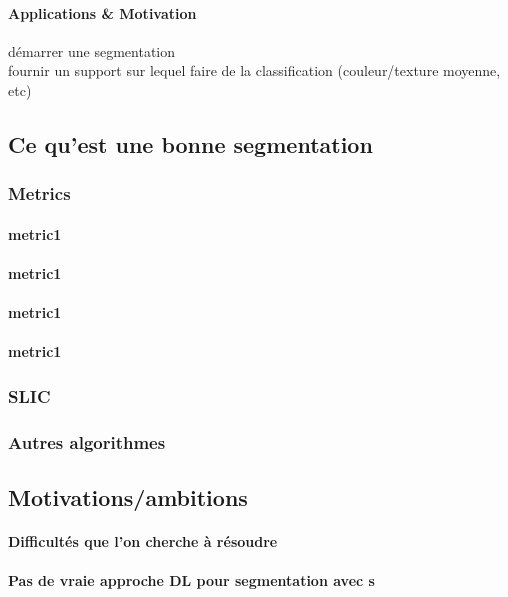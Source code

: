 \documentclass{article}
\begin{document}
            \paragraph{Applications \& Motivation}
            démarrer une segmentation\\
            fournir un support sur lequel faire de la classification (couleur/texture moyenne, etc)


    \subsection{Ce qu'est une bonne \spp segmentation}
        \subsubsection{Metrics}
            \paragraph{metric1}
            \paragraph{metric1}
            \paragraph{metric1}
            \paragraph{metric1}

        \subsubsection{SLIC}
        \subsubsection{Autres algorithmes}

    \subsection{Motivations/ambitions}
            \paragraph{Difficultés que l'on cherche à résoudre}
            \paragraph{Pas de vraie approche DL pour segmentation avec \spp s}
\end{document}
